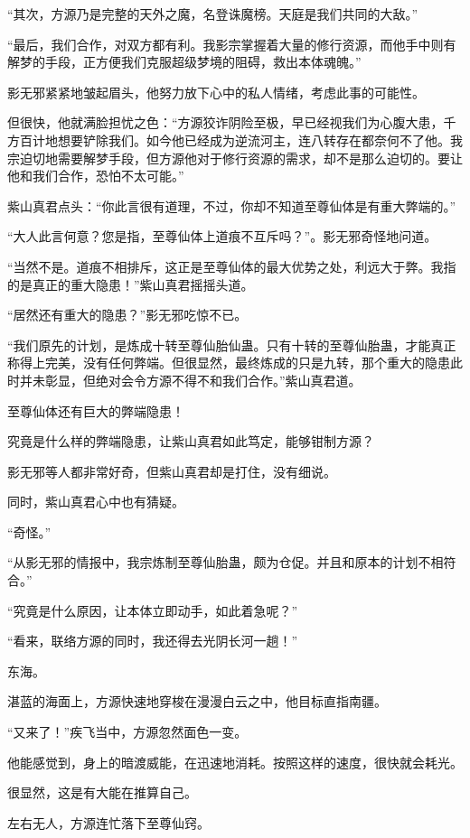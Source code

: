 \begin{this_body}
“其次，方源乃是完整的天外之魔，名登诛魔榜。天庭是我们共同的大敌。”

“最后，我们合作，对双方都有利。我影宗掌握着大量的修行资源，而他手中则有解梦的手段，正方便我们克服超级梦境的阻碍，救出本体魂魄。”

影无邪紧紧地皱起眉头，他努力放下心中的私人情绪，考虑此事的可能性。

但很快，他就满脸担忧之色：“方源狡诈阴险至极，早已经视我们为心腹大患，千方百计地想要铲除我们。如今他已经成为逆流河主，连八转存在都奈何不了他。我宗迫切地需要解梦手段，但方源他对于修行资源的需求，却不是那么迫切的。要让他和我们合作，恐怕不太可能。”

紫山真君点头：“你此言很有道理，不过，你却不知道至尊仙体是有重大弊端的。”

“大人此言何意？您是指，至尊仙体上道痕不互斥吗？”。影无邪奇怪地问道。

“当然不是。道痕不相排斥，这正是至尊仙体的最大优势之处，利远大于弊。我指的是真正的重大隐患！”紫山真君摇摇头道。

“居然还有重大的隐患？”影无邪吃惊不已。

“我们原先的计划，是炼成十转至尊仙胎仙蛊。只有十转的至尊仙胎蛊，才能真正称得上完美，没有任何弊端。但很显然，最终炼成的只是九转，那个重大的隐患此时并未彰显，但绝对会令方源不得不和我们合作。”紫山真君道。

至尊仙体还有巨大的弊端隐患！

究竟是什么样的弊端隐患，让紫山真君如此笃定，能够钳制方源？

影无邪等人都非常好奇，但紫山真君却是打住，没有细说。

同时，紫山真君心中也有猜疑。

“奇怪。”

“从影无邪的情报中，我宗炼制至尊仙胎蛊，颇为仓促。并且和原本的计划不相符合。”

“究竟是什么原因，让本体立即动手，如此着急呢？”

“看来，联络方源的同时，我还得去光阴长河一趟！”

东海。

湛蓝的海面上，方源快速地穿梭在漫漫白云之中，他目标直指南疆。

“又来了！”疾飞当中，方源忽然面色一变。

他能感觉到，身上的暗渡威能，在迅速地消耗。按照这样的速度，很快就会耗光。

很显然，这是有大能在推算自己。

左右无人，方源连忙落下至尊仙窍。


\end{this_body}
